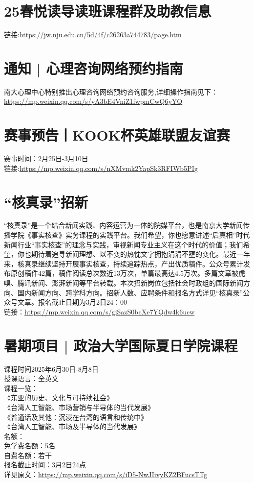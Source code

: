 \documentclass[letterpaper, 12pt]{article}
\begin{document}
\begin{multicols}{2}
\section{25春悦读导读班课程群及助教信息}
链接:\url{https://jw.nju.edu.cn/5d/4f/c26263a744783/page.htm}\\


\section{通知 | 心理咨询网络预约指南}
南大心理中心特别推出心理咨询网络预约咨询服务,详细操作指南见下：\\
\url{https://mp.weixin.qq.com/s/yA3bE4VniZ1fwpmCwQ6yYQ}\\

\section{赛事预告丨KOOK杯英雄联盟友谊赛}
赛事时间：2月25日-3月10日\\
链接:\url{https://mp.weixin.qq.com/s/nXMvmk2YapSk3RFIWb5PIg}\\


\section{“核真录”招新}
“核真录”是一个结合新闻实践、内容运营为一体的院媒平台，也是南京大学新闻传播学院《事实核查》实务课程的实践平台。我们希望，你也愿意讲述“后真相”时代新闻行业“事实核查”的理念与实践，审视新闻专业主义在这个时代的价值；我们希望，你也期待着追寻新闻理想、以不变的热忱文字拥抱涓涓不壅的变化。最近一年来，核真录继续坚持开展事实核查，持续追踪热点，产出优质稿件。公众号累计发布原创稿件42篇，稿件阅读总次数近13万次，单篇最高达4.5万次。多篇文章被虎嗅、腾讯新闻、澎湃新闻等平台转载。本次招新岗位包括社会时政组的国际新闻方向、国内新闻方向、跨学科方向。招新人数、应聘条件和报名方式详见“核真录”公众号文章。报名截止日期为3月2日24：00\\
链接：\url{https://mp.weixin.qq.com/s/giSazS0bcXe7YQdw4k6ucw}\\

\section{暑期项目 | 政治大学国际夏日学院课程}
课程时间2025年6月30日-8月8日\\
授课语言：全英文\\
课程一览：\\
《东亚的历史、文化与可持续社会》\\
《台湾人工智能、市场营销与半导体的当代发展》\\
《普通话及其他：沉浸在台湾的语言和传统中》\\
《台湾人工智能、市场及半导体的当代发展》\\
名额：\\
免学费名额：5名\\
自费名额：若干\\
报名截止时间：3月2日24点\\
详见原文：\url{https://mp.weixin.qq.com/s/iD5-NwJIivyKZ2BFucsTTg}


\end{multicols}
\end{document}
